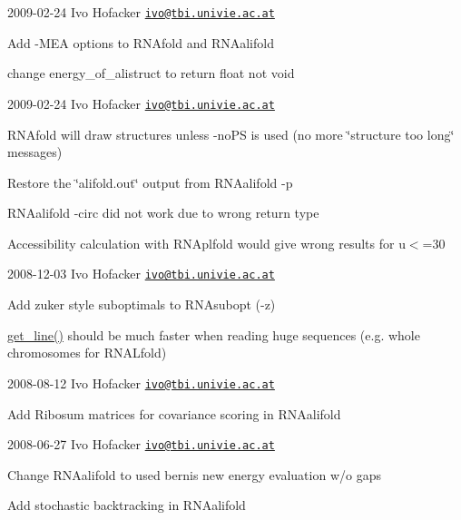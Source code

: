 2009-\/02-\/24 Ivo Hofacker \href{mailto:ivo@tbi.univie.ac.at}{\tt ivo@tbi.\+univie.\+ac.\+at}


\begin{DoxyItemize}
\item Add -\/\+M\+EA options to R\+N\+Afold and R\+N\+Aalifold
\item change energy\+\_\+of\+\_\+alistruct to return float not void
\end{DoxyItemize}

2009-\/02-\/24 Ivo Hofacker \href{mailto:ivo@tbi.univie.ac.at}{\tt ivo@tbi.\+univie.\+ac.\+at}


\begin{DoxyItemize}
\item R\+N\+Afold will draw structures unless -\/no\+PS is used (no more \char`\"{}structure too long\char`\"{} messages)
\item Restore the \char`\"{}alifold.\+out\char`\"{} output from R\+N\+Aalifold -\/p
\item R\+N\+Aalifold -\/circ did not work due to wrong return type
\item Accessibility calculation with R\+N\+Aplfold would give wrong results for u$<$=30
\end{DoxyItemize}

2008-\/12-\/03 Ivo Hofacker \href{mailto:ivo@tbi.univie.ac.at}{\tt ivo@tbi.\+univie.\+ac.\+at}


\begin{DoxyItemize}
\item Add zuker style suboptimals to R\+N\+Asubopt (-\/z)
\item \hyperlink{utils_8h_abe51806d14cff0789a8c1df7dbc45b71}{get\+\_\+line()} should be much faster when reading huge sequences (e.\+g. whole chromosomes for R\+N\+A\+Lfold)
\end{DoxyItemize}

2008-\/08-\/12 Ivo Hofacker \href{mailto:ivo@tbi.univie.ac.at}{\tt ivo@tbi.\+univie.\+ac.\+at}


\begin{DoxyItemize}
\item Add Ribosum matrices for covariance scoring in R\+N\+Aalifold
\end{DoxyItemize}

2008-\/06-\/27 Ivo Hofacker \href{mailto:ivo@tbi.univie.ac.at}{\tt ivo@tbi.\+univie.\+ac.\+at}


\begin{DoxyItemize}
\item Change R\+N\+Aalifold to used berni\textquotesingle{}s new energy evaluation w/o gaps
\item Add stochastic backtracking in R\+N\+Aalifold
\end{DoxyItemize}

